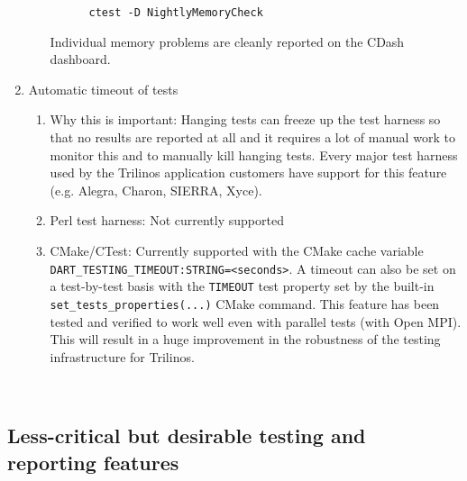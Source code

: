 \documentclass[pdf,ps2pdf,11pt]{SANDreport}
\begin{document}
\begin{enumerate}
\begin{enumerate}
    \begin{verbatim}
      ctest -D NightlyMemoryCheck
    \end{verbatim}

  Individual memory problems are cleanly reported on the CDash
  dashboard.

  \end{enumerate}

{}\item Automatic timeout of tests

  \begin{enumerate}

  {}\item Why this is important: Hanging tests can freeze up the test
  harness so that no results are reported at all and it requires a lot
  of manual work to monitor this and to manually kill hanging tests.
  Every major test harness used by the Trilinos application customers
  have support for this feature (e.g. Alegra, Charon, SIERRA, Xyce).

  {}\item Perl test harness: Not currently supported

  {}\item CMake/CTest: Currently supported with the CMake cache
  variable {}\texttt{DART\_TESTING\_TIMEOUT:STRING=<seconds>}.  A
  timeout can also be set on a test-by-test basis with the
  {}\texttt{TIMEOUT} test property set by the built-in
  {}\texttt{set\_tests\_properties(...)} CMake command.  This feature
  has been tested and verified to work well even with parallel tests
  (with Open MPI).  This will result in a huge improvement in the
  robustness of the testing infrastructure for Trilinos.

  \end{enumerate}

\end{enumerate}

\
%
{}\subsection{Less-critical but desirable testing and reporting features}
%
\end{document}
